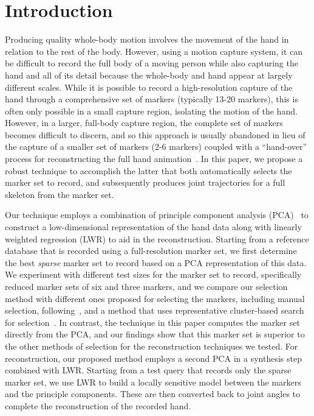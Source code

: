 

\section{Introduction}

Producing quality whole-body motion involves the movement of the hand in relation to the rest of the body. However, using a motion capture system, it can be difficult to record the full body of a moving person while also capturing the hand and all of its detail because the whole-body and hand appear at largely different scales.  While it is possible to record a high-resolution capture of the hand through a comprehensive set of markers (typically 13-20 markers), this is often only possible in a small capture region, isolating the motion of the hand.  However, in a larger, full-body capture region, the complete set of markers becomes difficult to discern, and so this approach is usually abandoned in lieu of the capture of a smaller set of markers (2-6 markers) coupled with a ``hand-over'' process for reconstructing the full hand animation~\cite{KanWheZor12}.  In this paper, we propose a robust technique to accomplish the latter that both automatically selects the marker set to record, and subsequently produces joint trajectories for a full skeleton from the marker set.  

Our technique employs a combination of principle component analysis (PCA)~\cite{bishopPCA} to construct a low-dimensional representation of the hand data along with linearly weighted regression (LWR) to aid in the reconstruction.  Starting from a reference database that is recorded using a full-resolution marker set, we first determine the best \emph{sparse} marker set to record based on a PCA representation of this data.  We experiment with different test sizes for the marker set to record, specifically reduced marker sets of six and three markers, and we compare our selection method with different ones proposed for selecting the markers, including manual selection, following~\cite{HoyRyaOSu11}, and a method that uses representative cluster-based search for selection~\cite{KanWheZor12}. In contrast, the technique in this paper computes the marker set directly from the PCA, and our findings show that this marker set is superior to the other methods of selection for the reconstruction techniques we tested.
For reconstruction, our proposed method employs a second PCA in a synthesis step combined with LWR.  
Starting from a test query that records only the sparse marker set, 
we use LWR to build a locally sensitive model between the markers and the principle components.  These
are then converted back to joint angles to complete the reconstruction of the recorded hand.  

